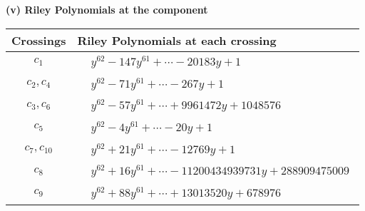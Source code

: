 \documentclass[1p]{elsarticle_modified}
\theoremstyle{definition}
\begin{document}
\newpage\renewcommand{\arraystretch}{1}
\flushleft \textbf{(v) Riley Polynomials at the component}\newline \\
\begin{tabular}{m{50pt}|m{274pt}}
Crossings & \hspace{64pt}Riley Polynomials at each crossing \\
\hline $$\begin{aligned}c_{1}\end{aligned}$$&$\begin{aligned}
&y^{62}-147 y^{61}+\cdots-20183 y+1
\end{aligned}$\\
\hline $$\begin{aligned}c_{2},c_{4}\end{aligned}$$&$\begin{aligned}
&y^{62}-71 y^{61}+\cdots-267 y+1
\end{aligned}$\\
\hline $$\begin{aligned}c_{3},c_{6}\end{aligned}$$&$\begin{aligned}
&y^{62}-57 y^{61}+\cdots+9961472 y+1048576
\end{aligned}$\\
\hline $$\begin{aligned}c_{5}\end{aligned}$$&$\begin{aligned}
&y^{62}-4 y^{61}+\cdots-20 y+1
\end{aligned}$\\
\hline $$\begin{aligned}c_{7},c_{10}\end{aligned}$$&$\begin{aligned}
&y^{62}+21 y^{61}+\cdots-12769 y+1
\end{aligned}$\\
\hline $$\begin{aligned}c_{8}\end{aligned}$$&$\begin{aligned}
&y^{62}+16 y^{61}+\cdots-11200434939731 y+288909475009
\end{aligned}$\\
\hline $$\begin{aligned}c_{9}\end{aligned}$$&$\begin{aligned}
&y^{62}+88 y^{61}+\cdots+13013520 y+678976
\end{aligned}$\\

\end{tabular}
\end{document}
